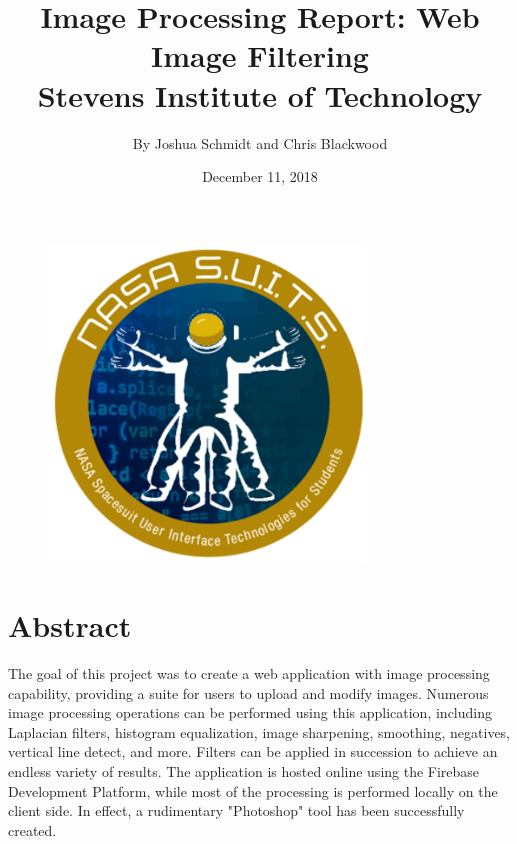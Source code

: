 \documentclass{article}
\title{%
    Image Processing Report: Web Image Filtering \\
    \large Stevens Institute of Technology}
\date{December 11, 2018}
\author{By Joshua Schmidt and Chris Blackwood}
\let\Oldsection\section
\renewcommand{\section}{\FloatBarrier\Oldsection}
\begin{document}
  \maketitle

  \bigskip
  \bigskip
  \bigskip
  \bigskip

  \begin{figure}[!htb]
    \centering
    \includegraphics[width=0.75\textwidth]{assets/logo.png}
    \label{fig:logo}
  \end{figure}

  \newpage

  \tableofcontents

  \newpage


  \section{Abstract}

  The goal of this project was to create a web application with image processing capability, providing a suite for users to upload and modify images. Numerous image processing operations can be performed using this application, including Laplacian filters, histogram equalization, image sharpening, smoothing, negatives, vertical line detect, and more. Filters can be applied in succession to achieve an endless variety of results. The application is hosted online using the Firebase Development Platform, while most of the processing is performed locally on the client side. In effect, a rudimentary "Photoshop" tool has been successfully created.
  
\end{document}
